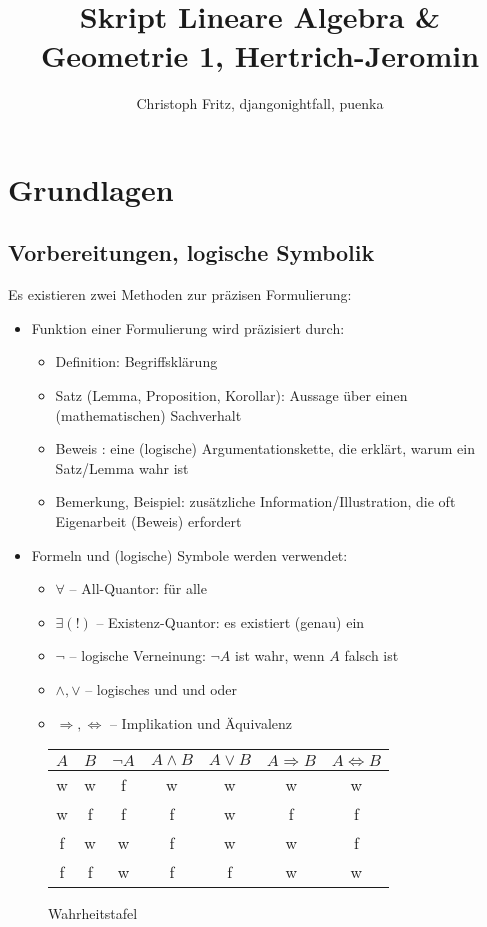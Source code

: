 \documentclass[12pt,a4paper,parskip=half-,DIV=15]{scrreprt}
\author{Christoph Fritz, djangonightfall, puenka}
\title{Skript Lineare Algebra \& Geometrie 1, Hertrich-Jeromin}
\begin{document}
\maketitle
\tableofcontents

\chapter{Grundlagen}

\section{Vorbereitungen, logische Symbolik}
Es existieren zwei Methoden zur präzisen Formulierung:
\begin{itemize}
\item Funktion einer Formulierung wird präzisiert durch:
	\begin{itemize}
	\item Definition: Begriffsklärung
	\item Satz (Lemma, Proposition, Korollar): Aussage über einen (mathematischen) Sachverhalt
	\item Beweis : eine (logische) Argumentationskette, die erklärt, warum ein Satz/Lemma wahr ist
	\item Bemerkung, Beispiel: zusätzliche Information/Illustration, die oft Eigenarbeit (Beweis) erfordert
	\end{itemize}
\item Formeln und (logische) Symbole werden verwendet:
	\begin{itemize}
	\item $\forall$ -- All-Quantor: \glqq für alle\grqq
	\item $\exists(!)$ -- Existenz-Quantor: \glqq es existiert (genau) ein\grqq
	\item $\lnot$ -- logische Verneinung: $\lnot A$ ist wahr, wenn $A$ falsch ist
	\item $\land ,\lor$ -- logisches \glqq und\grqq{} und \glqq oder\grqq
	\item $\Rightarrow ,\Leftrightarrow$ -- Implikation und Äquivalenz
	\end{itemize}
\end{itemize}

\begin{figure}[H]\centering
\begin{tabular}{c|c|c|c|c|c|c}
$A$ & $B$ & $\lnot A$ & $A\land B$ &$A\lor B$&$A \Rightarrow B$ & $A\Leftrightarrow B$\\\hline
w & w & f & w & w & w & w\\
w & f & f & f & w & f & f\\
f & w & w & f & w & w & f\\
f & f & w & f & f & w & w\\
\end{tabular}
\caption{Wahrheitstafel}
\end{figure}
\end{document}
